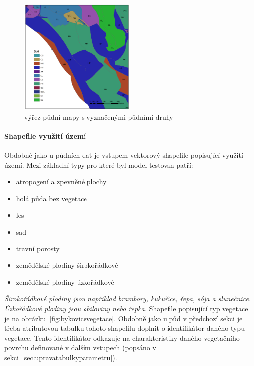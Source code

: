 \begin{figure}
  \centering
  \includegraphics[width=0.5\textwidth]{./img/pudy.png}
  \caption{výřez půdní mapy s vyznačenými půdními druhy}
  \label{fig:bykovicepuda}
\end{figure}

 
\paragraph{Shapefile využití území} \label{sec:vstupvegetace}

Obdobně jako u půdních dat je vstupem vektorový shapefile popisující využití území. Mezi základní typy pro které byl model testován patří:
\begin{itemize} \itemsep 0pt
  \item atropogení a zpevněné plochy  
  \item holá půda bez vegetace
  \item les
  \item sad
  \item travní porosty
  \item zemědělské plodiny širokořádkové
  \item zemědělské plodiny úzkořádkové
\end{itemize}

\textit{Širokořádkové plodiny jsou například brambory, kukuřice, řepa, sója a slunečnice. Úzkořádkové plodiny jsou obiloviny nebo řepka.}
Shapefile popisující typ vegetace je na obrázku~\ref{fig:bykovicevegetace}. Obdobně jako u půd v předchozí sekci je třeba atributovou tabulku tohoto shapefilu doplnit o identifikátor daného typu vegetace. Tento identifikátor odkazuje na charakteristiky daného vegetačního povrchu definované v dalším vstupech (popsáno v sekci~\ref{sec:upravatabulkyparametru}).

